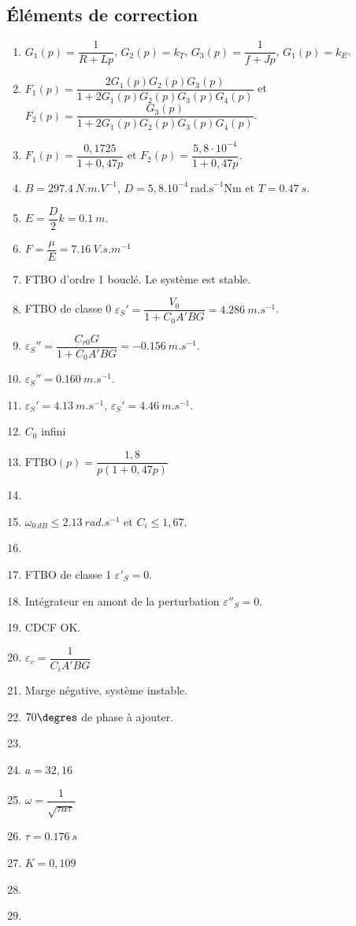 \documentclass[10pt,fleqn]{article} %
\begin{document}
\begin{multicols}{2}
\subsection*{Éléments de correction}
\footnotesize{
\begin{enumerate}
\item $G_1(p)=\dfrac{1}{R+Lp}$, $G_2(p)=k_T$, $G_3(p)=\dfrac{1}{f+Jp}$, $G_1(p)=k_E$. 
\item $F_1(p)=\dfrac{2G_1(p)G_2(p)G_3(p)}{1+2G_1(p)G_2(p)G_3(p)G_4(p)}$ et  
$F_2(p)=\dfrac{G_3(p)}{1+2G_1(p)G_2(p)G_3(p)G_4(p)}$.
\item $F_1(p)=\dfrac{0,1725}{1+0,47p}$ et $F_2(p)=\dfrac{5,8 \cdot 10^{-4}}{1+0,47p}$.
\item $B=\SI{297,4}{N.m.V^{-1}}$, $D=5,8.10^{-4}\,\text{rad.s}^{-1}\text{Nm}$ et $T=\SI{0,47}{s}$.
\item $E=\dfrac{D}{2}k=\SI{0,1}{m}$.
\item $F=\dfrac{\mu}{E}=\SI{7,16}{V.s.m^{-1}}$
\item FTBO d'ordre 1 bouclé. Le système est stable.
\item FTBO de classe 0 $\varepsilon_S'=\dfrac{V_0}{1+C_0A'BG}=\SI{4,286}{m.s^{-1}}$.
\item $\varepsilon_S''=\dfrac{C_{r0}G}{1+C_0A'BG}=\SI{-0,156}{m.s^{-1}}$.
\item $\varepsilon_S''=\SI{0,160}{m.s^{-1}}$.
\item $\varepsilon_S'=\SI{4,13}{m.s^{-1}}$, $\varepsilon_S'=\SI{4,46}{m.s^{-1}}$.
\item $C_0$ infini
\item $\text{FTBO}(p)=\dfrac{1,8}{p\left(1+0,47 p \right)}$
\item $\quad$
\item $\omega_{\SI{0}{dB}}\leq\SI{2,13}{rad.s^{-1}}$ et $C_i\leq1,67$.
\item $\quad$
\item FTBO de classe 1 $\varepsilon'_S=0$.
\item Intégrateur en amont de la perturbation $\varepsilon''_S=0$.
\item CDCF OK.
\item $\varepsilon_v=\dfrac{1}{C_iA'BG}$
\item Marge négative, système instable.
\item $70\degres$ de phase à ajouter.
\item $\quad$
\item $a=32,16$
\item $\omega=\dfrac{1}{\sqrt{\tau a \tau}}$
\item $\tau = \SI{0,176}{s}$
\item $K=0,109$
\item $\quad$
\item $\quad$
\end{enumerate}}


\end{multicols}
\end{document}
